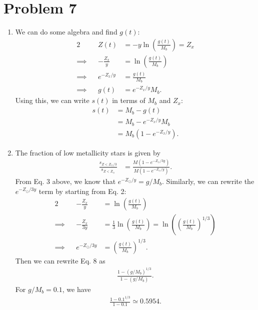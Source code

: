 \documentclass[11pt,letterpaper]{article}
\begin{document}
\section*{Problem 7}

\begin{enumerate}[label=(\roman*)]
    \item We can do some algebra and find $g(t)$:
        \begin{alignat}{2}
            &&Z(t) &= -y\ln{\left(\frac{g(t)}{M_b}\right)} = Z_x\\
            \implies&&-\frac{Z_x}{y} &= \ln{\left(\frac{g(t)}{M_b}\right)} \\
            \implies&&e^{-Z_x/y} &= \frac{g(t)}{M_b} \\
            \implies&&g(t) &= e^{-Z_x/y}M_b.
        \end{alignat}
    Using this, we can write $s(t)$ in terms of $M_b$ and $Z_x$:
    \begin{align}
        s(t) &= M_b - g(t) \\
        &= M_b - e^{-Z_x/y}M_b \\
        &= M_b(1-e^{-Z_x/y}).
    \end{align}
    
\item The fraction of low metallicity stars is given by
    \begin{align}
        \frac{s_{Z<Z_\odot/3}}{s_{Z<Z_\odot}} &= \frac{M(1-e^{-Z_\odot/3y})}{M(1-e^{-Z_\odot/y})}.
    \end{align}
    From Eq. 3 above, we know that $e^{-Z_\odot/y} = g/M_b$. Similarly, we can rewrite the $e^{-Z_\odot/3y}$ term by starting from Eq. 2:
    \begin{alignat}{2}
        &&-\frac{Z_x}{y} &= \ln{\left(\frac{g(t)}{M_b}\right)} \\
        \implies&&-\frac{Z_x}{3y} &= \frac{1}{3}\ln{\left(\frac{g(t)}{M_b}\right)} = \ln{\left(\left(\frac{g(t)}{M_b}\right)^{1/3}\right)} \\
        \implies&&e^{-Z_\odot/3y} &= \left(\frac{g(t)}{M_b}\right)^{1/3}.
    \end{alignat}
    Then we can rewrite Eq. 8 as 
    \begin{align}
        \frac{1-(g/M_b)^{1/3}}{1-(g/M_b)}.
    \end{align}
    For $g/M_b = 0.1$, we have 
    \begin{align}
        \frac{1-0.1^{1/3}}{1-0.1} \simeq 0.5954.
    \end{align}


\end{enumerate}
\end{document}
